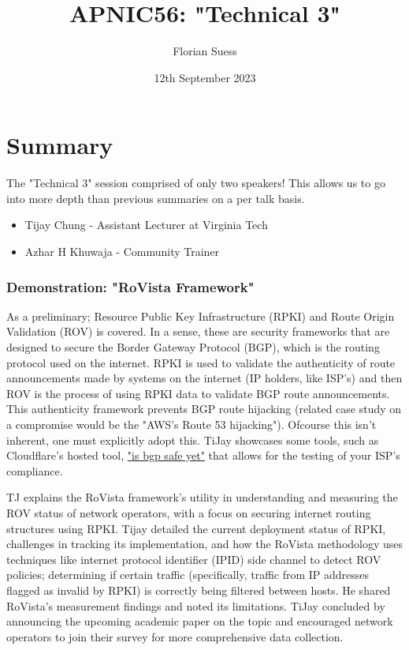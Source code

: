 \documentclass[twocolumn]{article}
\title{APNIC56: "Technical 3"}
\date{12th September 2023}
\author{Florian Suess}
\begin{document}
\maketitle

\section*{Summary}
The "Technical 3" session comprised of only two speakers! This allows us to go into more depth than previous summaries on a per talk basis.

\begin{itemize}
				\item Tijay Chung - Assistant Lecturer at Virginia Tech
				\item Azhar H Khuwaja - Community Trainer
\end{itemize}

\subsubsection*{Demonstration: "RoVista Framework"}
As a preliminary; Resource Public Key Infrastructure (RPKI) and Route Origin Validation (ROV) is covered. In a sense, these are security frameworks that are designed to secure the Border Gateway Protocol (BGP), which is the routing protocol used on the internet. RPKI is used to validate the authenticity of route announcements made by systems on the internet (IP holders, like ISP's) and then ROV is the process of using RPKI data to validate BGP route announcements. This authenticity framework prevents BGP route hijacking (related case study on a compromise would be the "AWS's Route 53 hijacking"). Ofcourse this isn't inherent, one must explicitly adopt this. TiJay showcases some tools, such as Cloudflare's hosted tool, \href{https://isbgpsafeyet.com/}{"is bgp safe yet"} that allows for the testing of your ISP's compliance.

TJ explains the RoVista framework's utility in understanding and measuring the ROV status of network operators, with a focus on securing internet routing structures using RPKI. Tijay detailed the current deployment status of RPKI, challenges in tracking its implementation, and how the RoVista methodology uses techniques like internet protocol identifier (IPID) side channel to detect ROV policies; determining if certain traffic (specifically, traffic from IP addresses flagged as invalid by RPKI) is correctly being filtered between hosts. He shared RoVista's measurement findings and noted its limitations. TiJay concluded by announcing the upcoming academic paper on the topic and encouraged network operators to join their survey for more comprehensive data collection.
\end{document}
